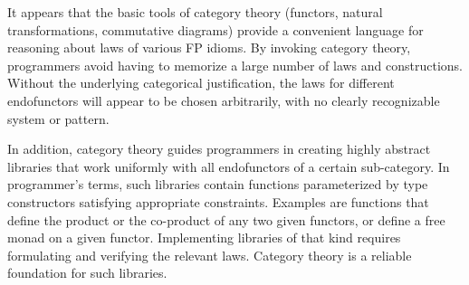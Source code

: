 It appears that the basic tools of category theory (functors, natural
transformations, commutative diagrams) provide a convenient language
for reasoning about laws of various FP idioms. By invoking category
theory, programmers avoid having to memorize a large number of laws
and constructions. Without the underlying categorical justification,
the laws for different endofunctors will appear to be chosen arbitrarily,
with no clearly recognizable system or pattern.

In addition, category theory guides programmers in creating highly
abstract libraries that work uniformly with all endofunctors of a
certain sub-category. In programmer\textsf{'}s terms, such libraries contain
functions parameterized by type constructors satisfying appropriate
constraints. Examples are functions that define the product or the
co-product of any two given functors, or define a free monad on a
given functor. Implementing libraries of that kind requires formulating
and verifying the relevant laws. Category theory is a reliable foundation
for such libraries.
